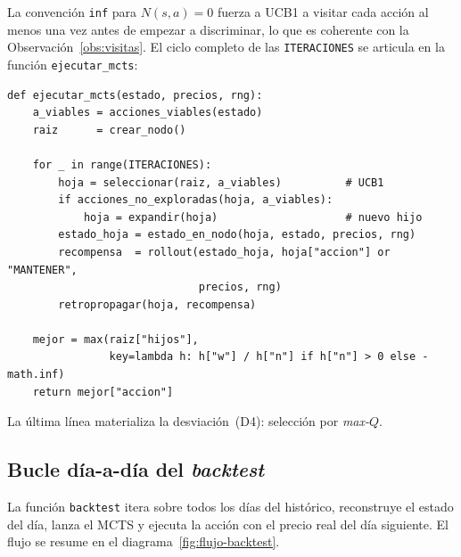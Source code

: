 La convención \texttt{inf} para $N(s,a) = 0$ fuerza a UCB1 a visitar cada acción al menos una vez antes de empezar a discriminar, lo que es coherente con la Observación~\ref{obs:visitas}. El ciclo completo de las \texttt{ITERACIONES} se articula en la función \texttt{ejecutar\_mcts}:

\begin{lstlisting}[caption={Núcleo del algoritmo MCTS.}, label={lst:mcts-core}]
def ejecutar_mcts(estado, precios, rng):
    a_viables = acciones_viables(estado)
    raiz      = crear_nodo()

    for _ in range(ITERACIONES):
        hoja = seleccionar(raiz, a_viables)          # UCB1
        if acciones_no_exploradas(hoja, a_viables):
            hoja = expandir(hoja)                    # nuevo hijo
        estado_hoja = estado_en_nodo(hoja, estado, precios, rng)
        recompensa  = rollout(estado_hoja, hoja["accion"] or "MANTENER",
                              precios, rng)
        retropropagar(hoja, recompensa)

    mejor = max(raiz["hijos"],
                key=lambda h: h["w"] / h["n"] if h["n"] > 0 else -math.inf)
    return mejor["accion"]
\end{lstlisting}

La última línea materializa la desviación~(D4): selección por \emph{max-$Q$}.

\subsection{Bucle día-a-día del \emph{backtest}}
\label{subsec:backtest}

La función \texttt{backtest} itera sobre todos los días del histórico, reconstruye el estado del día, lanza el MCTS y ejecuta la acción con el precio real del día siguiente. El flujo se resume en el diagrama~\ref{fig:flujo-backtest}.

